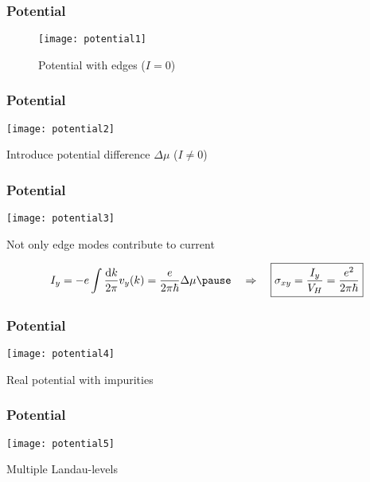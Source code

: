 \begin{frame}
\frametitle{Potential}
\begin{figure}
	\texttt{[image: potential1]}
	
	Potential with edges ($ I=0 $)
\end{figure}
\end{frame}

\begin{frame}
\frametitle{Potential}
	\texttt{[image: potential2]}
	\begin{center}
		Introduce potential difference $ \Delta \mu $ ($ I \neq 0 $)
	\end{center}
\end{frame}

\begin{frame}
\frametitle{Potential}
	\texttt{[image: potential3]}
	\begin{center}
		Not only edge modes contribute to current
		
		\begin{equation*}
		I_y = -e \int \dfrac{\mathrm{d}k}{2\pi} v_y(k) = \dfrac{e}{2\pi \hbar} \Delta \mu
		\pause \quad\Rightarrow\quad \boxed{\sigma_{xy} = \frac{I_y}{V_H} = \frac{e^2}{2\pi \hbar}}
		\end{equation*}

	\end{center}
\end{frame}

\begin{frame}
\frametitle{Potential}
	\texttt{[image: potential4]}
	\begin{center}
		Real potential with impurities
	\end{center}
\end{frame}

\begin{frame}
\frametitle{Potential}
	\texttt{[image: potential5]}
	\begin{center}
		Multiple Landau-levels
	\end{center}
\end{frame}